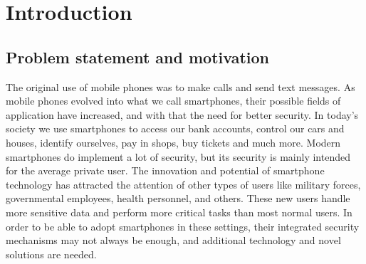 \chapter{Introduction}
\section{Problem statement and motivation}
The original use of mobile phones was to make calls and send text messages. As mobile phones evolved into what we call smartphones, their possible fields of application have increased, and with that the need for better security. In today's society we use smartphones to access our bank accounts, control our cars and houses, identify ourselves, pay in shops, buy tickets and much more. Modern smartphones do implement a lot of security, but its security is mainly intended for the average private user. The innovation and potential of smartphone technology has attracted the attention of other types of users like military forces, governmental employees, health personnel, and others. These new users handle more sensitive data and perform more critical tasks than most normal users. In order to be able to adopt smartphones in these settings, their integrated security mechanisms may not always be enough, and additional technology and novel solutions are needed.



